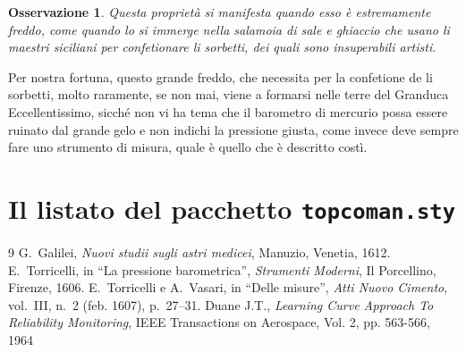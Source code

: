 \documentclass[%
,corpo=11pt
,twoside
,greek%
,cucitura
]{toptesi}
\newtheorem{osservazione}{Osservazione}%
\begin{document}

\begin{osservazione}\normalfont
Questa propriet\`a si manifesta quando esso \`e estremamente freddo, come
quando lo si immerge nella salamoia di sale e ghiaccio che usano li maestri
siciliani per confetionare li sorbetti, dei quali sono insuperabili artisti.
\end{osservazione}

Per nostra fortuna, questo grande freddo, che necessita per la confetione de
li sorbetti, molto raramente, se non mai, viene a formarsi nelle terre del
Granduca Eccellentissimo, sicch\'e non vi ha tema che il barometro di mercurio
possa essere ruinato dal grande gelo e non indichi la pressione giusta, come
invece deve sempre fare uno strumento di misura, quale \`e quello che \`e
descritto cost\`i.\cite{duane1964}

\chapter{Il listato del pacchetto \texttt{topcoman.sty}}


\begin{thebibliography}{9}
 G.~Galilei, {\em Nuovi studii sugli astri medicei}, Manuzio,
        Venetia, 1612.
 E.~Torricelli, in ``La pressione barometrica'', {\em Strumenti
        Moderni}, Il Porcellino, Firenze, 1606.
 E.~Torricelli e A.~Vasari, in ``Delle misure'', {\em Atti Nuovo
        Cimento}, vol.~III, n.~2 (feb. 1607), p.~27--31.
 Duane J.T., \emph{Learning Curve Approach To Reliability 
		Monitoring}, IEEE Transactions on Aerospace, Vol. 2, pp. 563-566, 1964
\end{thebibliography}
\end{document}
